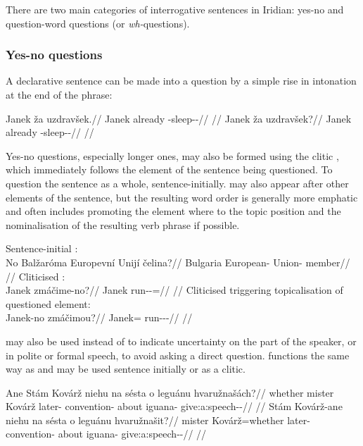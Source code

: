 There are two  main  categories  of  interrogative  sentences in Iridian: yes-no  and  question-word questions (or \emph{wh-}questions).

\subsubsection{Yes-no questions}

A declarative sentence can be made into a question by a simple rise in intonation at the end of the phrase:

\pex
\a
\begingl
\gla Janek ža uzdravšek.//
\glb Janek already \Refl{}-sleep-\Av{}-\Pf{}//
\glft {}//
\endgl
\a
\begingl
\gla Janek ža uzdravšek?//
\glb Janek already \Refl{}-sleep-\Av{}-\Pf{}//
\glft {}//
\endgl
\xe

Yes-no questions, especially longer ones, may also be formed using the clitic , which immediately follows the element of the sentence being questioned. To question the sentence as a whole,  sentence-initially.  may also appear after other elements of the sentence, but the resulting word order is generally more emphatic and often includes promoting the element where  to the topic position and the nominalisation of the resulting verb phrase if possible.


\pex
\a Sentence-initial :\\
  \begingl
  \gla No Balžaróma Europevní Unijí čelina?//
  \glb \Q{} Bulgaria European-\Att{} Union-\Gen{} member//
  \glft {}//
  \endgl
\a Cliticised :\\
  \begingl
  \gla Janek zmáčime-no?//
  \glb Janek run-\Av{}-\Prog{}=\Q{}//
  \glft {}//
  \endgl
\a Cliticised  triggering topicalisation of questioned element:\\
  \begingl
  \gla Janek-no zmáčimou?//
  \glb Janek=\Q{} run-\Av{}-\Prog{}-\Nz{}//
  \glft {}//
  \endgl
\xe

 may also be used instead of  to indicate uncertainty on the part of the speaker, or in polite or formal speech, to avoid asking a direct question.  functions the same way as  and may be used sentence initially or as a clitic.

\pex
\a\begingl
  \gla Ane Stám Kovárž niehu na sésta o leguánu hvaružnašách?//
  \glb whether mister Kovárž later-\Ins{} \Loc{} convention-\Acc{} about iguana-\Ins{} give:a:speech-\Av{}-\Ctp{}//
  \glft {}//
  \endgl
\a\begingl
  \gla Stám Kovárž-ane niehu na sésta o leguánu hvaružnašit?//
  \glb mister Kovárž=whether later-\Ins{} \Loc{} convention-\Acc{} about iguana-\Ins{} give:a:speech-\Av{}-\Sup{}//
  \glft {}//
  \endgl
\xe

